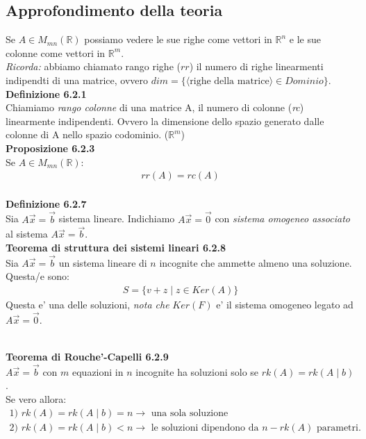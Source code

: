 \documentclass{article}
\begin{document}
\subsection{Approfondimento della teoria}
Se $A \in M_{mn}(\mathbb{R})$ possiamo vedere le sue righe come vettori in $\mathbb{R}^n$ e le sue colonne come vettori in $\mathbb{R}^m$. \\
\textit{Ricorda: }abbiamo chiamato rango righe ($rr$) il numero di righe linearmenti indipendti di una matrice, ovvero $dim=\{\langle\text{righe della matrice}\rangle \in Dominio\}$.
\vspace{5px}
\textbf{\\Definizione 6.2.1}
\\Chiamiamo \textit{rango colonne} di una matrice A, il numero di colonne (\textit{rc}) linearmente indipendenti. Ovvero la dimensione dello spazio generato dalle colonne di A nello spazio codominio. ($\mathbb{R}^m$)
\vspace{3px}
\textbf{\\Proposizione 6.2.3}
\\Se $A \in M_{mn}(\mathbb{R})$:
\begin{align*}
  rr(A)=rc(A)
\end{align*} 
\vspace{1em}
\textbf{\\Definizione 6.2.7}
\\ Sia $A\vec{x}=\vec{b}$ sistema lineare. Indichiamo $A\vec{x}=\vec{0}$ con \textit{sistema omogeneo associato} al sistema $A\vec{x}=\vec{b}$.
\vspace{1em}
\textbf{\\Teorema di struttura dei sistemi lineari 6.2.8}
\\Sia $A\vec{x}=\vec{b}$ un sistema lineare di $n$ incognite che ammette almeno una soluzione. Questa/e sono:
\begin{align*}
  S=\{v+z \mid z \in Ker(A)\}
\end{align*}
Questa e' una delle soluzioni, \textit{nota che} $Ker(F)$ e' il sistema omogeneo legato ad $A\vec{x}=\vec{0}$.

\vspace{2em}
\textbf{\\Teorema di Rouche'-Capelli 6.2.9}
\\$A\vec{x}=\vec{b}$ con $m$ equazioni in $n$ incognite ha soluzioni solo se $rk(A)=rk(A\mid b)$. \\
Se vero allora:
\begin{align*}
  \text{1) }rk(A)=rk(A \mid b)=n \to \text{ una sola soluzione} \\
  \text{2) }rk(A)=rk(A \mid b)<n \to \text{ le soluzioni dipendono da $n-rk(A)$ parametri}.
\end{align*}
\end{document}
